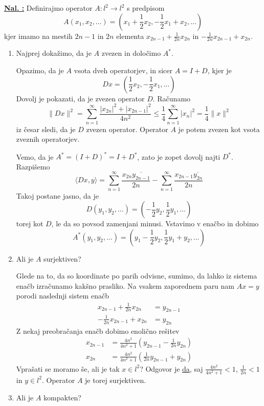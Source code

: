 \documentclass[a4paper, 12pt]{article}
\newcounter{excounter}[section]
\newenvironment{Exercise}
    {\refstepcounter{excounter}\underline{\textbf{Nal. \theexcounter:}}}
    {\par\vspace{\baselineskip}}
\begin{document}
\begin{Exercise}
    Definirajmo operator $A\colon l^2 \to l^2$ s predpisom
    \[
        A(x_1,x_2,\dots) = \left( x_1+\frac{1}{2}x_2,-\frac{1}{2}x_1 + x_2,\dots \right)
    \]
    kjer imamo na mestih $2n-1$ in $2n$ elementa $x_{2n-1} + \frac{1}{2n}x_{2n}$ in $-\frac{1}{2n}x_{2n-1} + x_{2n}$.
    \begin{enumerate}[label=(\alph*)]
        \item
            Najprej dokažimo, da je $A$ zvezen in določimo $A^*$.

            Opazimo, da je $A$ vsota dveh operatorjev, in sicer $A = I + D$,
            kjer je
            \[
                Dx = \left( \frac{1}{2}x_2, -\frac{1}{2}x_1,\dots \right)
            \]
            Dovolj je pokazati, da je zvezen operator $D$.
            Računamo
            \[
                \| Dx \|^2 = \sum_{n = 1}^\infty \frac{|x_{2n}|^2 + |x_{2n-1}|^2}{4n^2}
                \leq \frac{1}{4} \sum_{n = 1}^\infty |x_{n}|^2 = \frac{1}{4} \| x \|^2
            \]
            iz česar sledi, da je $D$ zvezen operator.
            Operator $A$ je potem zvezen kot vsota zveznih operatorjev.

            Vemo, da je $A^* = (I + D)^* = I + D^*$,
            zato je zopet dovolj najti $D^*$.
            Razpišemo
            \[
                \langle Dx,y \rangle = \sum_{n = 1}^\infty \frac{x_{2n}\overline{y_{2n-1}}}{2n}
                - \sum_{n = 1}^\infty \frac{x_{2n-1}\overline{y_{2n}}}{2n}
            \]
            Takoj postane jasno, da je
            \[
                D(y_1, y_2, \dots) = \left( -\frac{1}{2}y_2, \frac{1}{2}y_1,\dots \right)
            \]
            torej kot $D$, le da so povsod zamenjani minusi.
            Vstavimo v enačbo in dobimo
            \[
                A^*(y_1,y_2,\dots) = (y_1 - \frac{1}{2}y_2, \frac{1}{2}y_1 + y_2,\dots)
            \]
        \item
            Ali je $A$ surjektiven?
            
            Glede na to, da so koordinate po parih odvisne, sumimo,
            da lahko iz sistema enačb izračunamo kakšno prasliko.
            Na vsakem zaporednem paru nam $Ax = y$ porodi naslednji sistem enačb
            \begin{align*}
                x_{2n-1} + \frac{1}{2n}x_{2n} &= y_{2n-1} \\
                -\frac{1}{2n}x_{2n-1} + x_{2n} &= y_{2n}
            \end{align*}
            Z nekaj preobračanja enačb dobimo enolično rešitev
            \begin{align*}
                x_{2n-1} &= \frac{4n^2}{4n^2+1} \left(y_{2n-1} - \frac{1}{2n}y_{2n} \right) \\
                x_{2n} &= \frac{4n^2}{4n^2+1} \left( \frac{1}{2n}y_{2n-1} + y_{2n} \right)
            \end{align*}
            Vprašati se moramo še, ali je tak $x \in l^2$?
            Odgovor je \underline{da}, saj $\frac{4n^2}{4n^2+1} < 1$, $\frac{1}{2n} < 1$ in $y \in l^2$.
            Operator $A$ je torej surjektiven.
        \item
            Ali je $A$ kompakten?


\end{enumerate}
\end{Exercise}
\end{document}
